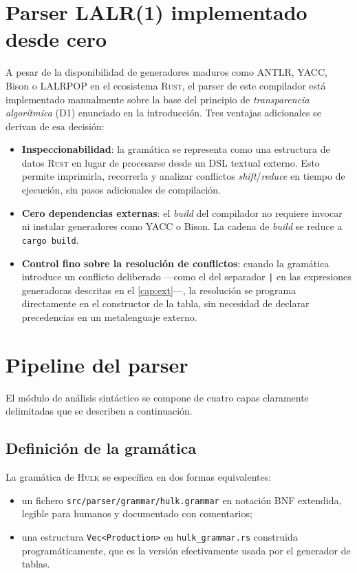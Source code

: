 \documentclass[11pt,a4paper,oneside,openany]{report}
\newcommand{\hulk}{\textsc{Hulk}}
\newcommand{\code}[1]{\texttt{#1}}
\newcommand{\rust}{\textsc{Rust}}
\begin{document}
\section{Parser LALR(1) implementado desde cero}

A pesar de la disponibilidad de generadores maduros como ANTLR, YACC, Bison o
LALRPOP en el ecosistema \rust{}, el parser de este compilador está implementado
manualmente sobre la base del principio de \emph{transparencia algorítmica}
(D1) enunciado en la introducción. Tres ventajas adicionales se derivan
de esa decisión:

\begin{itemize}
  \item \textbf{Inspeccionabilidad}: la gramática se representa como una
    estructura de datos \rust{} en lugar de procesarse desde un DSL textual
    externo. Esto permite imprimirla, recorrerla y analizar conflictos
    \textit{shift}/\textit{reduce} en tiempo de ejecución, sin pasos
    adicionales de compilación.
  \item \textbf{Cero dependencias externas}: el \textit{build} del compilador
    no requiere invocar ni instalar generadores como YACC o Bison. La
    cadena de \textit{build} se reduce a \code{cargo build}.
  \item \textbf{Control fino sobre la resolución de conflictos}: cuando la
    gramática introduce un conflicto deliberado ---como el del separador
    \code{|} en las expresiones generadoras descritas en el \cref{cap:ext}---,
    la resolución se programa directamente en el constructor de la tabla, sin
    necesidad de declarar precedencias en un metalenguaje externo.
\end{itemize}

\section{Pipeline del parser}

El módulo de análisis sintáctico se compone de cuatro capas claramente delimitadas
que se describen a continuación.

\subsection{Definición de la gramática}

La gramática de \hulk{} se específica en dos formas equivalentes:

\begin{itemize}
  \item un fichero \code{src/parser/grammar/hulk.grammar} en notación BNF extendida,
    legible para humanos y documentado con comentarios;
  \item una estructura \code{Vec<Production>} en \code{hulk\_grammar.rs} construida
    programáticamente, que es la versión efectivamente usada por el generador de
    tablas.
\end{itemize}
\end{document}
